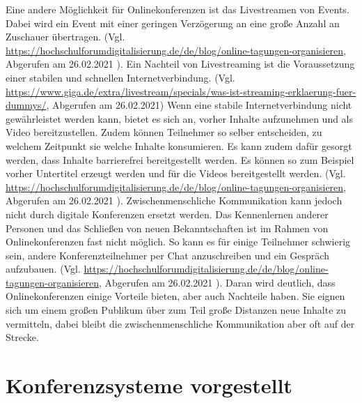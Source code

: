 Eine andere Möglichkeit für Onlinekonferenzen ist das Livestreamen von Events. Dabei wird ein Event mit einer geringen Verzögerung an eine große Anzahl an Zuschauer übertragen. (Vgl. \url{https://hochschulforumdigitalisierung.de/de/blog/online-tagungen-organisieren}, Abgerufen am 26.02.2021 ).
Ein Nachteil von Livestreaming ist die Voraussetzung einer stabilen und schnellen Internetverbindung. (Vgl. \url{https://www.giga.de/extra/livestream/specials/was-ist-streaming-erklaerung-fuer-dummys/}, Abgerufen am 26.02.2021)
Wenn eine stabile Internetverbindung nicht gewährleistet werden kann, bietet es sich an, vorher Inhalte aufzunehmen und als Video bereitzustellen. Zudem können Teilnehmer so selber entscheiden, zu welchem Zeitpunkt sie welche Inhalte konsumieren. Es kann zudem dafür gesorgt werden, dass Inhalte barrierefrei bereitgestellt werden. Es können so zum Beispiel vorher Untertitel erzeugt werden und für die Videos bereitgestellt werden. (Vgl. \url{https://hochschulforumdigitalisierung.de/de/blog/online-tagungen-organisieren}, Abgerufen am 26.02.2021 ).
Zwischenmenschliche Kommunikation kann jedoch nicht durch digitale Konferenzen ersetzt werden. Das Kennenlernen anderer Personen und das Schließen von neuen Bekanntschaften ist im Rahmen von Onlinekonferenzen fast nicht möglich. So kann es für einige Teilnehmer schwierig sein, andere Konferenzteilnehmer per Chat anzuschreiben und ein Gespräch aufzubauen. (Vgl. \url{https://hochschulforumdigitalisierung.de/de/blog/online-tagungen-organisieren}, Abgerufen am 26.02.2021 ).
Daran wird deutlich, dass Onlinekonferenzen einige Vorteile bieten, aber auch Nachteile haben. Sie eignen sich um einem großen Publikum über zum Teil große Distanzen neue Inhalte zu vermitteln, dabei bleibt die zwischenmenschliche Kommunikation aber oft auf der Strecke.

\section{Konferenzsysteme vorgestellt}
